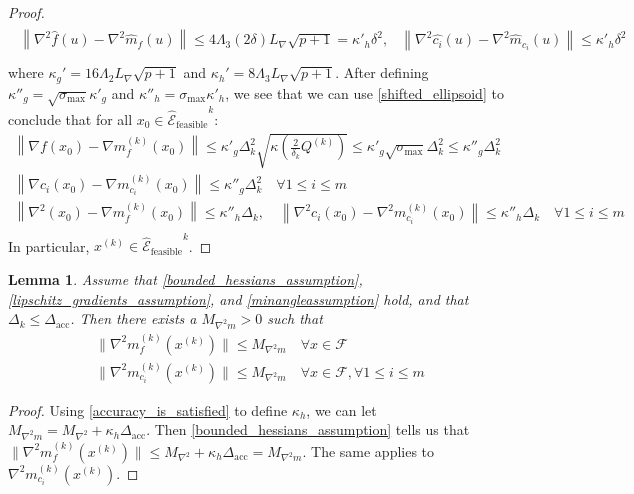 \documentclass{article}
\newtheorem{lemma}[theorem]{Lemma}
\theoremstyle{case}
\newcommand{\dacc}{{\Delta_{\text{acc}}}}
\newcommand{\dk}{\Delta_k}
\newcommand{\feasible}{{\mathcal F}}
\newcommand{\gradf}{\nabla f}
\newcommand{\hk}{{\nabla^2m_f^{(k)}(x^{(k)})}}
\newcommand{\lipgrad}{{L_{\nabla}}}
\newcommand{\maxhessian}{{M_{\nabla^2}}}
\newcommand{\maxmodelhessian}{{M_{\nabla^2 m}}}
\newcommand{\scaledunshiftedellipsoid}{{{\mathcal {\hat E}_{\text{feasible}}}^k}}
\newcommand{\sdk}{{\delta_k}}
\newcommand{\sigmamax}{{\sigma_{\text{max}}}}
\newcommand{\xk}{{x^{(k)}}}
\begin{document}
\begin{proof}
\begin{align*}
\begin{array}{cc}
\left\|\nabla^2 \hat {f}\left(u\right) - \nabla^2 \hat{m}_f\left(u\right) \right\|\le 4 \Lambda_3 \left(2\delta\right) \lipgrad \sqrt{p+1} = {\kappa'}_h\delta^2, &
\left\|\nabla^2 \hat {c_i}\left(u\right) - \nabla^2 \hat{m}_{c_i}\left(u\right) \right\|\le {\kappa'}_h\delta^2 \\
\end{array}
\end{align*}
where $\kappa_{g}' = 16 \Lambda_2 \lipgrad \sqrt{p+1}$ and $\kappa_{h}' = 8 \Lambda_3 \lipgrad\sqrt{p+1}$.
After defining $\kappa''_{g} =  \sqrt{\sigmamax}\kappa'_g$ and $\kappa''_h = \sigmamax\kappa'_h$, we see that
we can use  \cref{shifted_ellipsoid} to conclude that for all $x_0 \in \scaledunshiftedellipsoid$:
\begin{align*}
\left\|\gradf\left(x_0 \right) - \nabla m^{(k)}_f\left(x_0\right)\right\| \le 
\kappa'_g  \dk^2 \sqrt{\kappa\left(\frac 2 {\sdk} Q^{(k)}\right)} \le \kappa'_g \sqrt{\sigmamax}\dk^2 \le \kappa''_g\dk^2 \\
\left\|\nabla {c_i}\left(x_0 \right) - \nabla m^{(k)}_{c_i}\left(x_0\right)\right\| \le \kappa''_g\dk^2 \quad \forall 1 \le i \le m \\
\left\|\nabla^2\left(x_0 \right) - \nabla m^{(k)}_f\left(x_0\right)\right\| \le \kappa''_h\dk, \quad
\left\|\nabla^2 {c_i}\left(x_0 \right) - \nabla^2 m^{(k)}_{c_i}\left(x_0\right)\right\| \le \kappa''_h\dk \quad \forall 1 \le i \le m \\
\end{align*}
In particular, $\xk \in \scaledunshiftedellipsoid$.
\end{proof}



\begin{lemma}
\label{bounded_model_hessian_lemma}
Assume that \cref{bounded_hessians_assumption}, \cref{lipschitz_gradients_assumption}, and \cref{minangleassumption} hold, and that $\dk \le \dacc$.
Then there exists a $\maxmodelhessian > 0$ such that 
\begin{align*}
\| \hk \| \le \maxmodelhessian \quad \forall x \in \feasible \\
\|\nabla^2 m_{c_i}^{(k)}(\xk) \| \le \maxmodelhessian \quad \forall x \in \feasible, \forall 1 \le i \le m
\end{align*}
\end{lemma}

\begin{proof}
Using \cref{accuracy_is_satisfied} to define $\kappa_h$, we can let $\maxmodelhessian = \maxhessian + \kappa_h \dacc$.
Then \cref{bounded_hessians_assumption} tells us that $\|\hk\| \le \maxhessian + \kappa_h\dacc = \maxmodelhessian$.
The same applies to $\nabla^2 m_{c_i}^{(k)}(\xk)$.
\end{proof}
\end{document}
